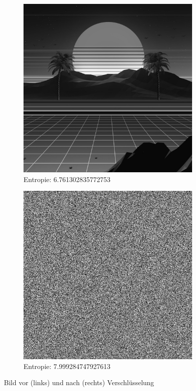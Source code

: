 \begin{figure}
	\centering

	\begin{subfigure}{0.35\textwidth}
		\includegraphics[width=\textwidth]{../1/3/gray_6.761302835772753_synthwave.jpg}
		\caption{Entropie: 6.761302835772753}
	\end{subfigure}
	\hfill
	\begin{subfigure}{0.35\textwidth}
		\includegraphics[width=\textwidth]{../1/3/encrypted_7.999284747927613_synthwave.jpg}
		\caption{Entropie: 7.999284747927613}
	\end{subfigure}

	\caption{Bild vor (links) und nach (rechts) Verschlüsselung}
	\label{fig:synthwave}
\end{figure}

